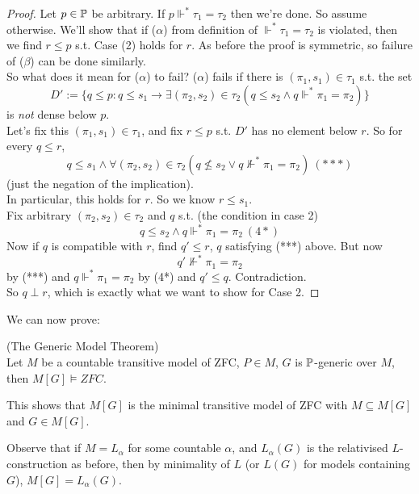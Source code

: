 \documentclass[a4paper]{article}
\begin{document}
\begin{proof}
Let $p \in \P$ be arbitrary. If $p\Vdash^* \tau_1 = \tau_2$ then we're done. So assume otherwise. We'll show that if ($\alpha$) from definition of $\Vdash^* \tau_1 = \tau_2$ is violated, then we find $r\leq p$ s.t. Case (2) holds for $r$. As before the proof is symmetric, so failure of ($\beta$) can be done similarly.\\
So what does it mean for ($\alpha$) to fail? ($\alpha$) fails if there is $(\pi_1,s_1) \in \tau_1$ s.t. the set
\[
D':=\{q \leq p: q \leq s_1 \to \exists (\pi_2,s_2) \in \tau_2 (q \leq s_2 \wedge q \Vdash^* \pi_1 = \pi_2)\}
\]
is \emph{not} dense below $p$.\\
Let's fix this $(\pi_1,s_1) \in \tau_1$, and fix $r \leq p$ s.t. $D'$ has no element below $r$. So for every $q \leq r$, 
\[
q \leq s_1 \wedge \forall (\pi_2,s_2) \in \tau_2 (q \not\leq s_2 \vee q \not\Vdash^* \pi_1=\pi_2)\ (***)
\]
(just the negation of the implication).\\
In particular, this holds for $r$. So we know $r \leq s_1$.\\
Fix arbitrary $(\pi_2,s_2) \in \tau_2$ and $q$ s.t. (the condition in case 2) 
\[
q \leq s_2 \wedge q \Vdash^* \pi_1 = \pi_2\ (4*)
\]
Now if $q$ is compatible with $r$, find $q' \leq r$, $q$ satisfying (***) above. But now
\[
q' \not\Vdash^*\pi_1=\pi_2
\]
by (***) and $q \Vdash^* \pi_1=\pi_2$ by (4*) and $q' \leq q$. Contradiction.\\
So $q \perp r$, which is exactly what we want to show for Case 2.
\end{proof}

We can now prove:
\begin{thm} (The Generic Model Theorem)\\
Let $M$ be a countable transitive model of ZFC, $P \in M$, $G$ is $\P$-generic over $M$, then $M[G] \vDash ZFC$.
\end{thm}

\begin{coro}
This shows that $M[G]$ is the minimal transitive model of ZFC with $M \subseteq M[G]$ and $G \in M[G]$.
\end{coro}

Observe that if $M=L_\alpha$ for some countable $\alpha$, and $L_\alpha(G)$ is the relativised $L$-construction as before, then by minimality of $L$ (or $L(G)$ for models containing $G$), $M[G] = L_\alpha(G)$.
\end{document}
